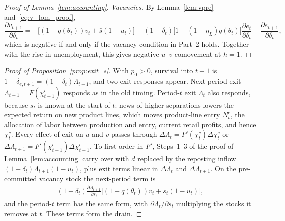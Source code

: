 \documentclass[authoryear, review, 12pt]{elsarticle}
\begin{document}
\begin{proof}[Proof of Lemma~\ref{lem:accounting}]
\emph{Vacancies.}
By Lemma~\ref{lem:vpre} and~\eqref{eq:v_lom_proof},
\[
	\frac{\partial v_{t+1}}{\partial\delta_t}
	= -\bigl[(1-q(\theta_t))v_t+\bar{s}(1-u_t)\bigr]
	+(1-\delta_t)\bigl[1-(1-\eta_L)q(\theta_t)\bigr]
	\frac{\partial e_t}{\partial\delta_t}
	+\frac{\partial e_{t+1}}{\partial\delta_t},
\]
which is negative if and only if the vacancy condition in Part~2 holds. Together with
the rise in unemployment, this gives negative $u$--$v$ comovement at $h=1$.
\end{proof}

\begin{proof}[Proof of Proposition~\ref{prop:exit_s}]
With $p_0>0$, survival into $t+1$ is
$1-\delta_{e,t+1}=(1-\delta_t)\Lambda_{t+1}$, and two exit responses
appear. Next-period exit $\Lambda_{t+1}=F(\chi^c_{t+1})$ responds as in
the old timing. Period-$t$ exit $\Lambda_t$ also responds, because $s_t$
is known at the start of $t$: news of higher separations lowers the
expected return on new product lines, which moves product-line entry
$N^e_t$, the allocation of labor between production and entry, current
retail profits, and hence $\chi^c_t$. Every effect of exit on $u$ and
$v$ passes through $\Delta\Lambda_t=F'(\chi^c_t)\Delta\chi^c_t$ or
$\Delta\Lambda_{t+1}=F'(\chi^c_{t+1})\Delta\chi^c_{t+1}$. To first order
in $F'$, Steps~1--3 of the proof of Lemma~\ref{lem:accounting} carry over with $d$ replaced by the
reposting inflow $(1-\delta_t)\Lambda_{t+1}(1-u_t)$, plus exit terms
linear in $\Delta\Lambda_t$ and $\Delta\Lambda_{t+1}$. On the
pre-committed vacancy stock the next-period term is
\begin{align}\label{eq:dv_ds_full}
	(1-\delta_t)\frac{\partial\Lambda_{t+1}}{\partial s_t}
	\bigl[(1-q(\theta_t))v_t+s_t(1-u_t)\bigr],
\end{align}
and the period-$t$ term has the same form, with $\partial\Lambda_t/\partial s_t$
multiplying the stocks it removes at $t$. These terms form the drain.


\end{proof}
\end{document}
